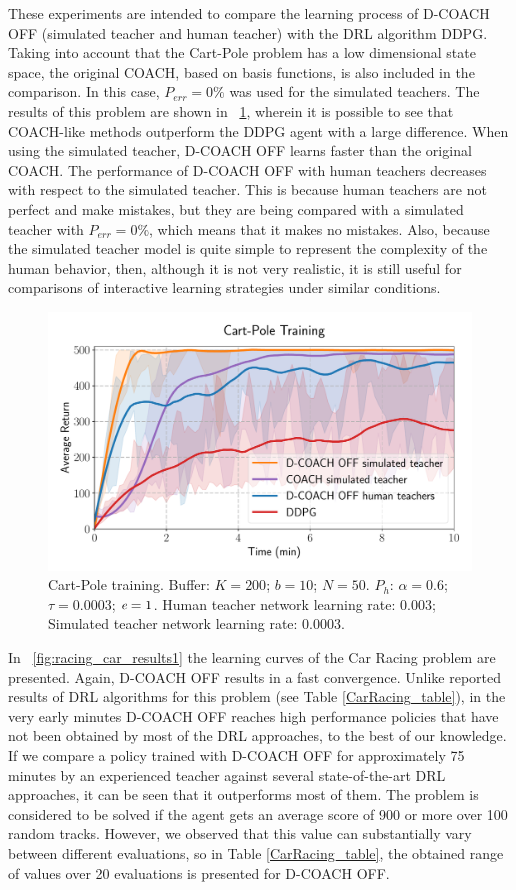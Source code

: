 These experiments are intended to compare the learning process of D-COACH OFF (simulated teacher and human teacher) with the DRL algorithm DDPG. Taking into account that the Cart-Pole problem has a low dimensional state space, the original COACH, based on basis functions, is also included in the comparison. In this case, $P_\mathit{err}=0\%$ was used for the simulated teachers. The results of this problem are shown in \figurename~{\ref{fig:cartpole_results}}, wherein it is possible to see that COACH-like methods outperform the DDPG agent with a large difference. When using the simulated teacher, D-COACH OFF learns faster than the original COACH. The performance of D-COACH OFF with human teachers decreases with respect to the simulated teacher. This is because human teachers are not perfect and make mistakes, but they are being compared with a simulated teacher with $P_\mathit{err}=0\%$, which means that it makes no mistakes. Also, because the simulated teacher model is quite simple to represent the complexity of the human behavior, then, although it is not very realistic, it is still useful for comparisons of interactive learning strategies under similar conditions.

\begin{figure}[h]
    \centering
    \includegraphics[width=0.7\linewidth]{imagenes/cap3/offline_cart_pole_humans.pdf}
    \caption[Cart-Pole training.]{Cart-Pole training. Buffer: $K = 200$; $b = 10$; $N = 50$. $P_{h}$: $\alpha = 0.6$; $\tau = 0.0003$; $\emph{e}=1$. Human teacher network learning rate: $0.003$; Simulated teacher network learning rate: $0.0003$.}
    \label{fig:cartpole_results}
\end{figure}

In \figurename~{\ref{fig:racing_car_results1}} the learning curves of the Car Racing problem are presented. Again, D-COACH OFF results in a fast convergence. Unlike reported results of DRL algorithms for this problem (see Table \ref{CarRacing_table}), in the very early minutes D-COACH OFF reaches high performance policies that have not been obtained by most of the DRL approaches, to the best of our knowledge. If we compare a policy trained with D-COACH OFF for approximately 75 minutes by an experienced teacher against several state-of-the-art DRL approaches, it can be seen that it outperforms most of them. The problem is considered to be solved if the agent gets an average score of 900 or more over 100 random tracks. However, we observed that this value can substantially vary between different evaluations, so in Table \ref{CarRacing_table}, the obtained range of values over 20 evaluations is presented for D-COACH OFF.

